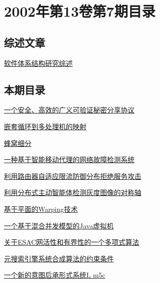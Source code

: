 \documentclass[a4paper]{article}
\begin{document}
\section{\textbf{2002年第13卷第7期目录}}
\subsection{综述文章}
\href{http://www.jos.org.cn/ch/reader/download_pdf.aspx?file_no=20020706&year_id=2002&quarter_id=7&falg=1}{软件体系结构研究综述}

\subsection{本期目录}
\href{http://www.jos.org.cn/ch/reader/download_pdf.aspx?file_no=20020701&year_id=2002&quarter_id=7&falg=1}{一个安全、高效的广义可验证秘密分享协议}

\href{http://www.jos.org.cn/ch/reader/download_pdf.aspx?file_no=20020702&year_id=2002&quarter_id=7&falg=1}{嵌套循环到多处理机的映射}

\href{http://www.jos.org.cn/ch/reader/download_pdf.aspx?file_no=20020703&year_id=2002&quarter_id=7&falg=1}{蜂窝细分}

\href{http://www.jos.org.cn/ch/reader/download_pdf.aspx?file_no=20020704&year_id=2002&quarter_id=7&falg=1}{一种基于智能移动代理的网络故障检测系统}

\href{http://www.jos.org.cn/ch/reader/download_pdf.aspx?file_no=20020705&year_id=2002&quarter_id=7&falg=1}{利用路由器自适应限流防御分布拒绝服务攻击}

\href{http://www.jos.org.cn/ch/reader/download_pdf.aspx?file_no=20020707&year_id=2002&quarter_id=7&falg=1}{利用分布式主动智能体检测灰度图像的对称轴}

\href{http://www.jos.org.cn/ch/reader/download_pdf.aspx?file_no=20020708&year_id=2002&quarter_id=7&falg=1}{基于平面的Warping技术}

\href{http://www.jos.org.cn/ch/reader/download_pdf.aspx?file_no=20020709&year_id=2002&quarter_id=7&falg=1}{一个基于混合并发模型的Java虚拟机}

\href{http://www.jos.org.cn/ch/reader/download_pdf.aspx?file_no=20020710&year_id=2002&quarter_id=7&falg=1}{关于ESAC网活性和有界性的一个多项式算法}

\href{http://www.jos.org.cn/ch/reader/download_pdf.aspx?file_no=20020711&year_id=2002&quarter_id=7&falg=1}{元搜索引擎系统合成算法的约束条件}

\href{http://www.jos.org.cn/ch/reader/download_pdf.aspx?file_no=20020712&year_id=2002&quarter_id=7&falg=1}{一个新的意图后承形式系统L m5c}
\end{document}
